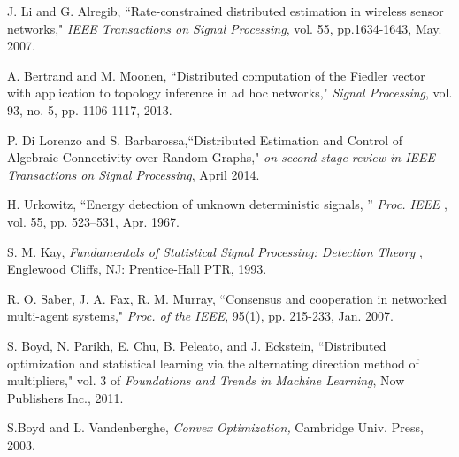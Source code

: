 \documentclass[conference]{IEEEtran}
\begin{document}
\begin{thebibliography}{80}
 J. Li and G. Alregib, ``Rate-constrained distributed estimation in wireless sensor networks," \emph{IEEE  Transactions on Signal Processing}, vol. 55, pp.1634-1643,  May. 2007.

 A. Bertrand and M. Moonen, ``Distributed computation of the Fiedler vector with application to topology inference in ad hoc networks," \emph{Signal Processing}, vol. 93, no. 5, pp. 1106-1117, 2013.

 P. Di Lorenzo and S. Barbarossa,``Distributed Estimation and Control of Algebraic Connectivity over Random Graphs," \emph{on second stage review in IEEE Transactions on Signal Processing}, April 2014.  


 H. Urkowitz, ``Energy detection of unknown deterministic signals, ” \emph{ Proc. IEEE }, vol. 55, pp. 523–531, Apr. 1967.

 S. M. Kay, \emph{Fundamentals of Statistical Signal Processing: Detection Theory }, Englewood Cliffs, NJ: Prentice-Hall PTR, 1993.

 R. O. Saber, J. A. Fax, R. M. Murray, ``Consensus and cooperation in networked multi-agent systems," \emph{Proc. of the IEEE}, 95(1), pp. 215-233, Jan. 2007.

 S. Boyd, N. Parikh, E. Chu, B. Peleato, and J. Eckstein, ``Distributed optimization and statistical learning via the alternating direction method of multipliers," vol. 3 of \emph{Foundations and Trends in Machine Learning}, Now Publishers Inc., 2011.

 S.Boyd and L. Vandenberghe, \emph{Convex Optimization,} Cambridge Univ. Press, 2003.

\end{thebibliography}

 























\ifCLASSOPTIONcaptionsoff
  \newpage
\fi
\end{document}
